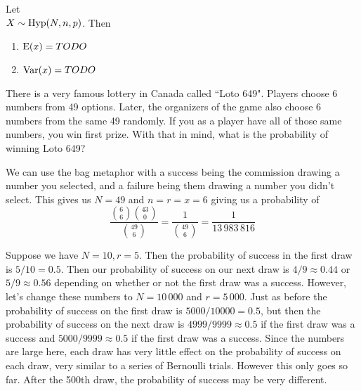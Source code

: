 \begin{theorem}
    Let \\ $X \sim \textup{Hyp}(N,n,p)$. Then
    \begin{enumerate}
        \item $\textup{E}(x)=TODO\quad$
        \item $\textup{Var}(x)=TODO\quad$
    \end{enumerate}
\end{theorem}

\begin{example}[Loto 649]
    There is a very famous lottery in Canada called ``Loto 649". Players choose 6 numbers from 49 options. Later, the organizers of the game also choose 6 numbers from the same 49 randomly. If you as a player have all of those same numbers, you win first prize. With that in mind, what is the probability of winning Loto 649?

    We can use the bag metaphor with a success being the commission drawing a number you selected, and a failure being them drawing a number you didn't select. This gives us $N=49$ and $n=r=x=6$ giving us a probability of
    \[
        \displaystyle\frac{\binom 6 6 \binom {43}{0}}{\binom {49}{6}}=\frac 1{\binom {49} 6}=\frac 1 {13\,983\,816}
    \]
\end{example}
Suppose we have $N=10, r=5$. Then the probability of success in the first draw is $5/10=0.5$. Then our probability of success on our next draw is $4/9\approx 0.44$ or $5/9\approx 0.56$ depending on whether or not the first draw was a success. However, let's change these numbers to $N=10\,000$ and $r=5\,000$. Just as before the probability of success on the first draw is $5000/10000=0.5$, but then the probability of success on the next draw is $4999/9999\approx 0.5$ if the first draw was a success and $5000/9999\approx 0.5$ if the first draw was a success. Since the numbers are large here, each draw has very little effect on the probability of success on each draw, very similar to a series of Bernoulli trials. However this only goes so far. After the 500th draw, the probability of success may be very different. 
